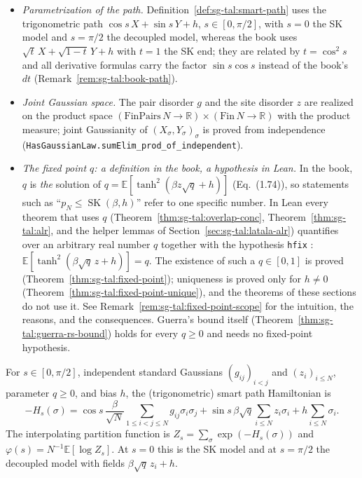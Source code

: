 \begin{remark}\label{rem:sg-tal:dev-13}
\begin{itemize}
\item \emph{Parametrization of the path.} Definition~\ref{def:sg-tal:smart-path} uses the trigonometric path $\cos s\,X+\sin s\,Y+h$, $s\in[0,\pi/2]$, with $s=0$ the SK model and $s=\pi/2$ the decoupled model, whereas the book uses $\sqrt t\,X+\sqrt{1-t}\,Y+h$ with $t=1$ the SK end; they are related by $t=\cos^2 s$ and all derivative formulas carry the factor $\sin s\cos s$ instead of the book's $dt$ (Remark~\ref{rem:sg-tal:book-path}).
\item \emph{Joint Gaussian space.} The pair disorder $g$ and the site disorder $z$ are realized on the product space $(\mathrm{FinPairs}\,N\to\mathbb R)\times(\mathrm{Fin}\,N\to\mathbb R)$ with the product measure; joint Gaussianity of $(X_\sigma,Y_\sigma)_\sigma$ is proved from independence (\texttt{HasGaussianLaw.sumElim\_prod\_of\_independent}).
\item \emph{The fixed point $q$: a definition in the book, a hypothesis in Lean.} In the book, $q$ is \emph{the} solution of $q=\mathbb{E}[\tanh^2(\beta z\sqrt q+h)]$ (Eq.~(1.74)), so statements such as ``$p_N\le\operatorname{SK}(\beta,h)$'' refer to one specific number. In Lean every theorem that uses $q$ (Theorem~\ref{thm:sg-tal:overlap-conc}, Theorem~\ref{thm:sg-tal:alr}, and the helper lemmas of Section~\ref{sec:sg-tal:latala-alr}) quantifies over an arbitrary real number $q$ together with the hypothesis \texttt{hfix} : $\mathbb{E}[\tanh^2(\beta\sqrt q\,z+h)]=q$. The existence of such a $q\in[0,1]$ is proved (Theorem~\ref{thm:sg-tal:fixed-point}); uniqueness is proved only for $h\ne0$ (Theorem~\ref{thm:sg-tal:fixed-point-unique}), and the theorems of these sections do not use it. See Remark~\ref{rem:sg-tal:fixed-point-scope} for the intuition, the reasons, and the consequences. Guerra's bound itself (Theorem~\ref{thm:sg-tal:guerra-rs-bound}) holds for every $q\ge0$ and needs no fixed-point hypothesis.
\end{itemize}
\end{remark}

\begin{definition}\label{def:sg-tal:smart-path}
For $s \in [0, \pi/2]$, independent standard Gaussians $(g_{ij})_{i<j}$ and $(z_i)_{i \le N}$, parameter $q \ge 0$, and bias $h$, the (trigonometric) smart path Hamiltonian is
\[
-H_s(\sigma) = \cos s \,\frac{\beta}{\sqrt{N}} \sum_{1 \le i < j \le N} g_{ij} \sigma_i \sigma_j + \sin s \,\beta \sqrt{q} \sum_{i \le N} z_i \sigma_i + h \sum_{i \le N} \sigma_i.
\]
The interpolating partition function is $Z_s = \sum_\sigma \exp(-H_s(\sigma))$ and $\varphi(s) = N^{-1}\mathbb{E}[\log Z_s]$. At $s = 0$ this is the SK model and at $s = \pi/2$ the decoupled model with fields $\beta\sqrt q\, z_i + h$.
\end{definition}

